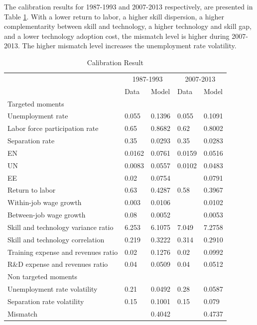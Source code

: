 \documentclass[12pt]{article}
\newcommand{\1}{\mathbb{1}}
\begin{document}
The calibration results for 1987-1993 and 2007-2013 respectively, are presented in Table \ref{Calibration_Result}. With a lower return to labor, a higher skill dispersion, a higher complementarity between skill and technology, a higher technology and skill gap, and a lower technology adoption cost, the mismatch level is higher during 2007-2013. The higher mismatch level increases the unemployment rate volatility. 
 
\begin{table}[h!]
\scriptsize
\begin{center}
\begin{tabular}{l|llll}
\hline \hline
           & \multicolumn{2}{c}{1987-1993}     & \multicolumn{2}{c}{2007-2013}                \\ 
            & Data     &  Model   & Data     &  Model     \\ \hline
Targeted moments  \\
Unemployment rate          & 0.055 & 0.1396 & 0.055 & 0.1091 \\
Labor force participation rate            & 0.65  & 0.8682 & 0.62  & 0.8002 \\
Separation rate          & 0.35  & 0.0293 & 0.35  & 0.0283 \\
EN       & 0.0162  & 0.0761 & 0.0159  & 0.0516 \\
UN      & 0.0083  &  0.0557 & 0.0102  & 0.0483 \\
EE       & 0.02  & 0.0754&   & 0.0791 \\
Return to labor        & 0.63  & 0.4287 & 0.58  & 0.3967 \\
Within-job wage growth      & 0.003 & 0.0106 &   & 0.0102 \\
Between-job wage growth    & 0.08  & 0.0052     &   & 0.0053     \\
Skill and technology variance ratio          & 6.253   & 6.1075 & 7.049  & 7.2758 \\
Skill and technology correlation        & 0.219 & 0.3222 & 0.314 & 0.2910  \\
Training expense and revenues ratio & 0.02  & 0.1276   & 0.02 & 0.0992  \\
R\&D expense and revenues ratio  & 0.04 & 0.0509  & 0.04  & 0.0512 \\
\hline
Non targeted moments                  \\
Unemployment rate volatility          & 0.21  & 0.0492  & 0.28  & 0.0587 \\
Separation rate volatility           & 0.15  & 0.1001 & 0.15  & 0.079 \\
Mismatch && 0.4042 && 0.4737 \\
\hline 
\end{tabular}
\end{center}
\caption{Calibration Result}
\label{Calibration_Result}
\end{table}
\end{document}
